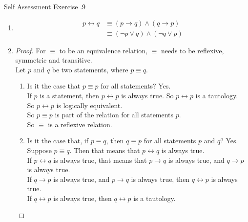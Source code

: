 \documentclass[../notes.tex]{subfiles}
\begin{document}
			\pagebreak
			\begin{exercise}{Self Assessment Exercise \thechapter.9}
				\begin{enumerate}
					\item {}
						\begin{align*}
							p \leftrightarrow q &\equiv (p \rightarrow q) \land (q \rightarrow p)\\
							&\equiv (\lnot p \lor q) \land (\lnot q \lor p)
						\end{align*}
					\item {}
						\begin{proof}
							For $\equiv$ to be an equivalence relation, $\equiv$ needs to be reflexive, symmetric and transitive.\\
							Let $p$ and $q$ be two statements, where $p \equiv q$.
							\begin{enumerate}[label=(\roman*)]
								\item
									\begin{subproof}[Reflexivity]
										Is it the case that $p \equiv p$ for all statements? Yes.\\
										If $p$ is a statement, then $p \leftrightarrow p$ is always true. So $p \leftrightarrow p$ is a tautology.\\
										So $p \leftrightarrow p$ is logically equivalent.\\
										So $p \equiv p$ is part of the relation for all statements $p$.\\
										So $\equiv$ is a reflexive relation.
									\end{subproof}
								\item
									\begin{subproof}[Symmetry]
										Is it the case that, if $p \equiv q$, then $q \equiv p$ for all statements $p$ and $q$? Yes.\\
										Suppose $p \equiv q$. Then that means that $p \leftrightarrow q$ is always true.\\
										If $p \leftrightarrow q$ is always true, that means that $p \rightarrow q$ is always true, and $q \rightarrow p$ is always true.\\
										If $q \rightarrow p$ is always true, and $p \rightarrow q$ is always true, then $q \leftrightarrow p$ is always true.\\
										If $q \leftrightarrow p$ is always true, then $q \leftrightarrow p$ is a tautology.\\

\end{subproof}
\end{enumerate}
\end{proof}
\end{enumerate}
\end{exercise}
\end{document}
